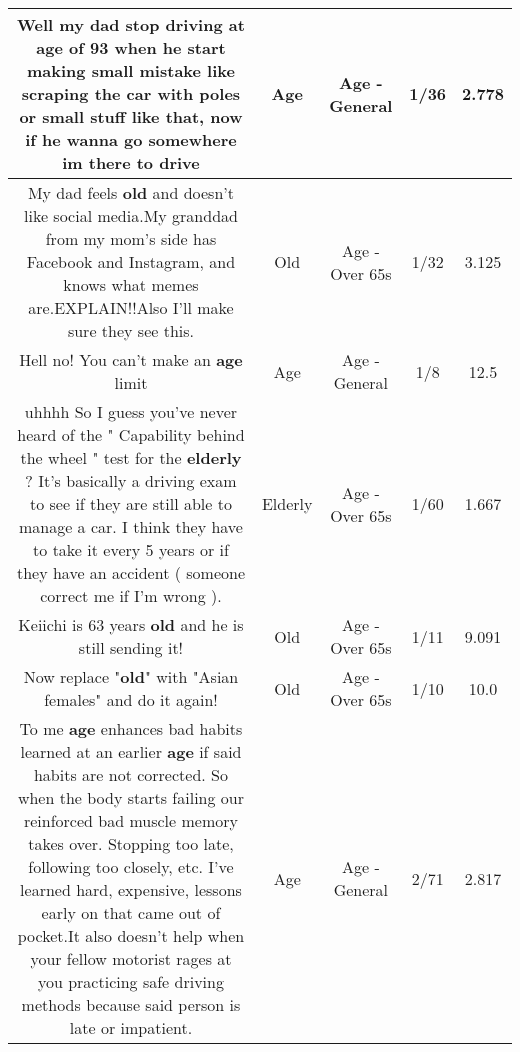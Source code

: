 \documentclass[11pt]{article}
\newlength\mylength
\begin{document}
\begin{center}
\begin{longtable}{|C{.65\mylength}|C{.30\mylength}|C{.12\mylength}|C{.12\mylength}|C{.12\mylength}|}
  \small Well my dad stop driving at \textbf{age} of 93 when he start making small mistake like scraping the car with poles or small stuff like that, now if he wanna go somewhere im there to drive\normalsize   & Age & Age - General & 1/36 & 2.778 \\  \hline
  \small My dad feels \textbf{old} and doesn't like social media.My granddad from my mom's side has Facebook and Instagram, and knows what memes are.EXPLAIN!!Also I'll make sure they see this.\normalsize   & Old & Age - Over 65s & 1/32 & 3.125 \\  \hline
  \small Hell no! You can't make an \textbf{age} limit\normalsize   & Age & Age - General & 1/8 & 12.5 \\  \hline
  \small uhhhh So I guess you've never heard of the " Capability behind the wheel " test for the \textbf{elderly} ? It's basically a driving exam to see if they are still able to manage a car. I think they have to take it every 5 years or if they have an accident ( someone correct me if I'm wrong  ).\normalsize   & Elderly & Age - Over 65s & 1/60 & 1.667 \\  \hline
  \small Keiichi is 63 years \textbf{old} and he is still sending it!\normalsize   & Old & Age - Over 65s & 1/11 & 9.091 \\  \hline
  \small Now replace "\textbf{old}" with "Asian females" and do it again!\normalsize   & Old & Age - Over 65s & 1/10 & 10.0 \\  \hline
  \small To me \textbf{age} enhances bad habits learned at an earlier \textbf{age} if said habits are not corrected.  So when the body starts failing our reinforced bad muscle memory takes over.  Stopping too late, following too closely, etc.  I've learned hard, expensive, lessons early on that came out of pocket.It also doesn't help when your fellow motorist rages at you practicing safe driving methods because said person is late or impatient.\normalsize   & Age & Age - General & 2/71 & 2.817 \\  \hline

\end{longtable}
\end{center}
\end{document}
